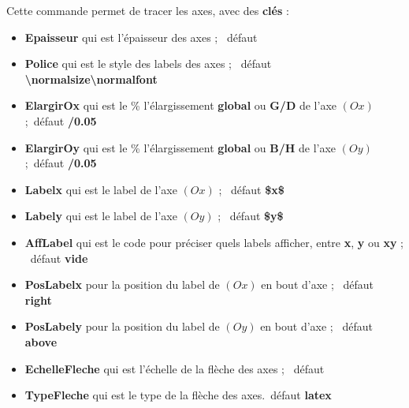 \documentclass[a4paper,french,11pt]{article}
\newcommand\cmaj[1]{%
	{\tcbox[vignetteMaJ]{#1}\xspace}%
}
\newcommand\Cle[1]{{\bfseries\sffamily\textlangle #1\textrangle}}
\begin{document}
\begin{codecles}
Cette commande permet de tracer les axes, avec des \Cle{clés} :

\begin{itemize}
	\item \Cle{Epaisseur} qui est l'épaisseur des axes ; \hfill~défaut \Cle{1pt}
	\item \Cle{Police} qui est le style des labels des axes  ; \hfill~défaut \Cle{\textbackslash{}normalsize\textbackslash{}normalfont}
	\item \cmaj{2.1.2} \Cle{ElargirOx} qui est le \% l'élargissement \Cle{global} ou \Cle{G/D} de l'axe $(Ox)$ ;\hfill~défaut \Cle{0/0.05}
	\item \cmaj{2.1.2} \Cle{ElargirOy} qui est le \% l'élargissement \Cle{global} ou \Cle{B/H} de l'axe $(Oy)$ ;\hfill~défaut \Cle{0/0.05}
	\item \Cle{Labelx} qui est le label de l'axe $(Ox)$ ; \hfill~défaut \Cle{\${}x\$}
	\item \Cle{Labely} qui est le label de l'axe $(Oy)$ ; \hfill~défaut \Cle{\${}y\$}
	\item \Cle{AffLabel} qui est le code pour préciser quels labels afficher, entre \Cle{x}, \Cle{y} ou \Cle{xy} ; \hfill~défaut \Cle{vide}
	\item \Cle{PosLabelx} pour la position du label de $(Ox)$ en bout d'axe ; \hfill~défaut \Cle{right}
	\item \Cle{PosLabely} pour la position du label de $(Oy)$ en bout d'axe ; \hfill~défaut \Cle{above}
	\item \Cle{EchelleFleche} qui est l'échelle de la flèche des axes ; \hfill~défaut \Cle{1}
	\item \Cle{TypeFleche} qui est le type de la flèche des axes.\hfill~défaut \Cle{latex}
\end{itemize}
\end{codecles}

\begin{codetex}
\AxesTikz

\AxesTikz%
	[AffLabel=xy,Labelx={Nombre de jours},Labely={Nombre d'individus infectés, en centaines},%
	PosLabelx={above left},PosLabely={above right},%
	Police=\small\sffamily,ElargirOx=0,ElargirOy=0]
\end{codetex}

\begin{codesortie}
\hfill~
\begin{tikzpicture}%
	[x=0.1cm,y=0.0167cm, %
	xmin=0,xmax=60,xgrille=5,xgrilles=5, %
	ymin=0,ymax=240,ygrille=30,ygrilles=30] %
	\AxesTikz
\end{tikzpicture}
~~
\begin{tikzpicture}%
	[x=0.1cm,y=0.0167cm, %
	xmin=0,xmax=60,xgrille=5,xgrilles=5, %
	ymin=0,ymax=240,ygrille=30,ygrilles=30] %
	\AxesTikz%
	[AffLabel=xy,Labelx={Nombre de jours},
	Labely={Nombre d'individus infectés, en centaines},%
	PosLabelx={above left},PosLabely={above right},%
	ElargirOx=0,ElargirOy=0,
	Police=\small\sffamily]
\end{tikzpicture}
\hfill~
\end{codesortie}
\end{document}
